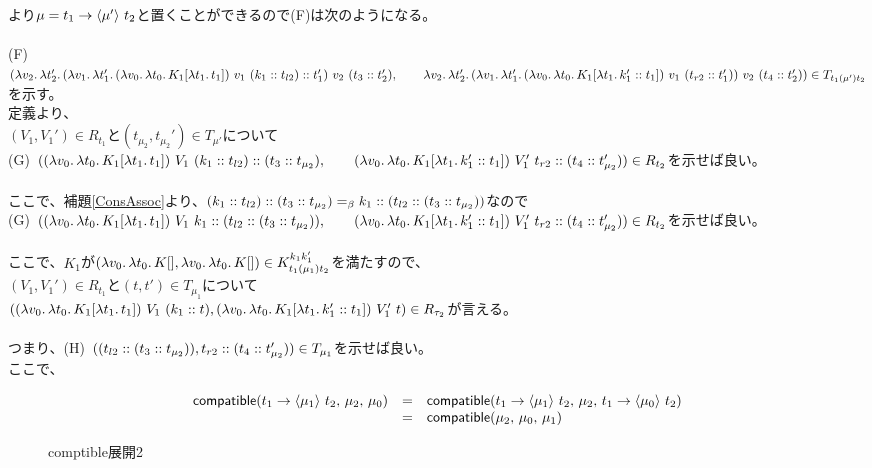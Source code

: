 \documentclass[japanese,draft]{jssst_ppl} %
\begin{document}
より$\mu=\Trail{t_1}{t_2}{\mu'}$と置くことができるので(F)は次のようになる。\\
\\
(F)\ $(\Lam{v_2}{\Lam{t_2'}{\LamP{v_1}{\Lam{t_1'}{\LamP{v_0}{\Lam{t_0}{K_1[\Lam{t_1}{t_1}]}}}\ v_1\ \Cons{\ConsP{k_1}{t_{l2}}}{t_1'}}}\ v_2\ \ConsP{t_3}{t_2'}},\\
\qquad \Lam{v_2}{\Lam{t_2'}{\LamP{v_1}{\Lam{t_1'}{\LamP{v_0}{\Lam{t_0}{K_1[\Lam{t_1}{\Cons{k_1'}{t_1}}]}}}\ v_1\ \ConsP{t_{r2}}{t_1'}}}\ v_2\ \ConsP{t_4}{t_2'}})\in T_{t_1(\mu')t_2}$を示す。\\
定義より、\\
$(V_1,V_1')\in R_{t_1}$と$(t_{\mu_2},t_{\mu_2}')\in T_{\mu'}$について\\
(G)\ $(\LamP{v_0}{\Lam{t_0}{K_1[\Lam{t_1}{t_1}]}}\ V_1\ \Cons{\ConsP{k_1}{t_{l2}}}{\ConsP{t_3}{t_{\mu_2}}},\\
\qquad \LamP{v_0}{\Lam{t_0}{K_1[\Lam{t_1}{\Cons{k_1'}{t_1}}]}}\ V_1'\ \Cons{t_{r2}}{\ConsP{t_4}{t_{\mu_2}'}})\in R_{t_2}$を示せば良い。\\
\\
ここで、補題\ref{ConsAssoc}より、$\Cons{\ConsP{k_1}{t_{l2}}}{\ConsP{t_3}{t_{\mu_2}}} =_{\beta} \Cons{k_1}{\ConsP{t_{l2}}{\ConsP{t_3}{t_{\mu_2}}}}$なので\\
(G)\ $(\LamP{v_0}{\Lam{t_0}{K_1[\Lam{t_1}{t_1}]}}\ V_1\ \Cons{k_1}{\ConsP{t_{l2}}{\ConsP{t_3}{t_{\mu_2}}}},\\
\qquad \LamP{v_0}{\Lam{t_0}{K_1[\Lam{t_1}{\Cons{k_1'}{t_1}}]}}\ V_1'\ \Cons{t_{r2}}{\ConsP{t_4}{t_{\mu_2}'}})\in R_{t_2}$を示せば良い。\\
\\
ここで、$K_1$が$(\Lam{v_0}{\Lam{t_0}{K[]}}, \Lam{v_0}{\Lam{t_0}{K[]}})\in K^{k_1k_1'}_{t_1 (\mu_1) t_2}$を満たすので、\\
$(V_1,V_1')\in R_{t_1}$と$(t,t')\in T_{\mu_1}$について\\
$(\LamP{v_0}{\Lam{t_0}{K_1[\Lam{t_1}{t_1}]}}\ V_1\ \ConsP{k_1}{t}, \LamP{v_0}{\Lam{t_0}{K_1[\Lam{t_1}{\Cons{k_1'}{t_1}}]}}\ V_1'\ t)
\in R_{\tau_2}$が言える。\\
\\
つまり、(H)\ $(\ConsP{t_{l2}}{\ConsP{t_3}{t_{\mu_2}}},\Cons{t_{r2}}{\ConsP{t_4}{t_{\mu_2}'}})\in T_{\mu_1}$を示せば良い。
\\
ここで、\\
\begin{figure}[h]
\[
\begin{array}{lcl}
  \Compatible{\Trail{t_1}{t_2}{\mu_1}}{\mu_2}{\mu_0} &=& \Compatible{\Trail{t_1}{t_2}{\mu_1}}{\mu_2}{\Trail{t_1}{t_2}{\mu_0}}\\
  &=& \Compatible{\mu_2}{\mu_0}{\mu_1}
\end{array}
\]
\caption{\textsf{comptible}展開2}
\label{Compatible2}
\end{figure}\\
\end{document}
